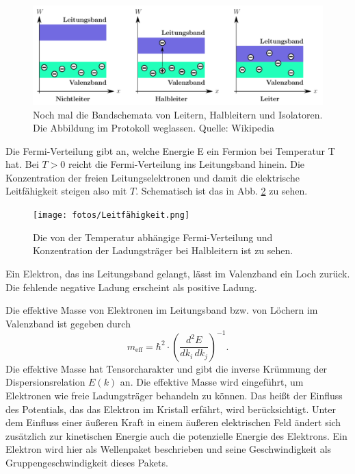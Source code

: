 \begin{figure}
    \centering
    \includegraphics[width=12cm]{fotos/Bandschemata2.png}
    \caption{Noch mal die Bandschemata von Leitern, Halbleitern und Isolatoren. Die Abbildung im Protokoll weglassen. Quelle: Wikipedia}
    \label{fig:Bandschemata2}
\end{figure}

Die Fermi-Verteilung gibt an, welche Energie E ein Fermion bei Temperatur T hat. Bei $T > \num{0}$ reicht die Fermi-Verteilung ins Leitungsband hinein. Die Konzentration der freien Leitungselektronen und damit die elektrische Leitfähigkeit steigen also mit $T$. Schematisch ist das in Abb. \ref{fig:Leitfähigkeit} zu sehen. \cite{demtroeder} %

\begin{figure}
    \centering
    \texttt{[image: fotos/Leitfähigkeit.png]}
    \caption{Die von der Temperatur abhängige Fermi-Verteilung und Konzentration der Ladungsträger bei Halbleitern ist zu sehen. \cite{demtroeder}}
    \label{fig:Leitfähigkeit}
\end{figure}

Ein Elektron, das ins Leitungsband gelangt, lässt im Valenzband ein Loch zurück. Die fehlende negative Ladung erscheint als positive Ladung. \cite{demtroeder}

Die effektive Masse von Elektronen im Leitungsband bzw. von Löchern im Valenzband ist gegeben durch
\begin{equation}
    m_\text{eff} = \hbar^2 \cdot \left( \frac{d^2 E}{dk_i \, dk_j} \right)^{-1}.
    \label{eq:m_eff}
\end{equation}
Die effektive Masse hat Tensorcharakter und gibt die inverse Krümmung der Dispersionsrelation $E(k)$ an. \cite{demtroeder}
Die effektive Masse wird eingeführt, um Elektronen wie freie Ladungsträger behandeln zu können. Das heißt der Einfluss des Potentials, das das Elektron im Kristall erfährt, wird berücksichtigt. Unter dem Einfluss einer äußeren Kraft in einem äußeren elektrischen Feld ändert sich zusätzlich zur kinetischen Energie auch die potenzielle Energie des Elektrons. Ein Elektron wird hier als Wellenpaket beschrieben und seine Geschwindigkeit als Gruppengeschwindigkeit dieses Pakets. \cite{demtroeder}


